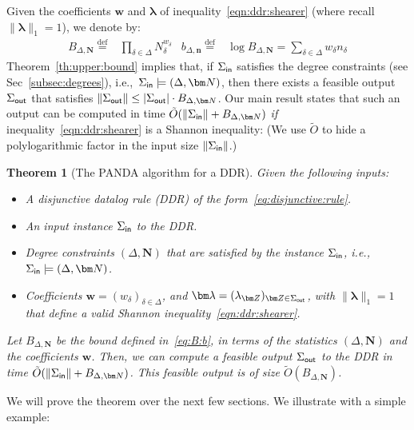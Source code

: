 \documentclass[10pt,a4paper]{article}
\newtheorem{theorem}{Theorem}[section]
\newcommand{\norm}[1]{\|#1\|}
\newcommand{\defeq}{\stackrel{\text{def}}{=}}
\newcommand{\inn}{\text{\sf in}}
\newcommand{\out}{\text{\sf out}}
\newcommand{\panda}{\textsf{PANDA}\xspace}
\begin{document}
Given the coefficients $\bm w$ and $\bm \lambda$ of inequality~\eqref{eqn:ddr:shearer}
(where recall $\norm{\bm \lambda}_1 = 1$), we denote by:
%
\begin{align}
  B_{\Delta,\bm N} \defeq & \prod_{\delta \in \Delta} N^{w_\delta}_\delta
  & b_{\Delta,\bm n} \defeq
  & \log  B_{\Delta,\bm N} = \sum_{\delta \in \Delta} w_\delta n_\delta \label{eq:B:b}
\end{align}
%
Theorem~\ref{th:upper:bound} implies that, if $\Sigma_{\inn}$ satisfies the degree
constraints (see Sec~\ref{subsec:degrees}), i.e.,~$\Sigma_{\inn} \models (\Delta,\bm N)$,
then there exists a feasible output $\Sigma_{\out}$ that satisfies
$\norm{\Sigma_{\out}} \leq |\Sigma_\out|\cdot
B_{\Delta,\bm N}$.  Our main result states that such an output can be computed in time
$\tilde O(\norm{\Sigma_\inn}+B_{\Delta,\bm N})$ {\em if} inequality~\eqref{eqn:ddr:shearer}
is a Shannon inequality: (We use $\tilde O$ to hide a polylogarithmic factor in the input
size $\norm{\Sigma_{\inn}}$.)

\begin{theorem}[The \panda algorithm for a DDR] \label{th:algorithm}
    Given the following inputs:
    \begin{itemize}
        \item A disjunctive datalog rule (DDR) of the form~\eqref{eq:disjunctive:rule}.
        \item An input instance $\Sigma_\inn$ to the DDR.
        \item Degree constraints $(\Delta,\bm N)$ that are satisfied by the instance $\Sigma_\inn$,
            i.e.,~$\Sigma_\inn \models (\Delta, \bm N)$.
        \item Coefficients
          $\bm w = (w_\delta)_{\delta \in \Delta}$,
          and $\bm \lambda = (\lambda_{\bm Z})_{\bm Z \in \Sigma_\out}$, with $\norm{\bm\lambda}_1=1$
          that define a valid Shannon inequality~\eqref{eqn:ddr:shearer}.
    \end{itemize}
Let $B_{\Delta, \bm N}$ be the bound defined in~\eqref{eq:B:b}, in terms of the statistics
$(\Delta, \bm N)$ and the coefficients $\bm w$.
Then, we can compute a feasible output $\Sigma_{\out}$ to the
  DDR
  in time $\tilde O(\norm{\Sigma_\inn} + B_{\Delta,\bm N})$.
  This feasible output is of size $\tilde O(B_{\Delta,\bm N})$.
\end{theorem}

We will prove the theorem over the next few sections.  We illustrate with a simple example:
\end{document}
